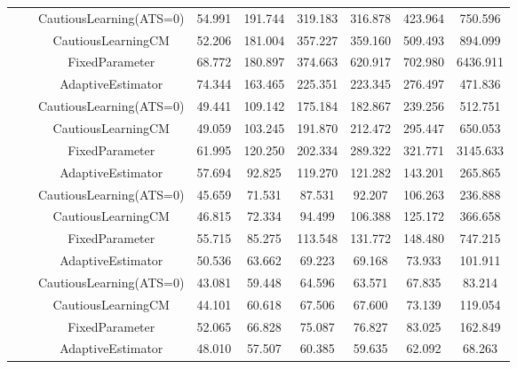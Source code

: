 \begin{table}[!h]
\begin{tabular}[t]{ccccccccc}
 &  & CautiousLearning(ATS=0) & 54.991 & 191.744 & 319.183 & 316.878 & 423.964 & 750.596\\

 &  & CautiousLearningCM & 52.206 & 181.004 & 357.227 & 359.160 & 509.493 & 894.099\\

 & \multirow[t]{-4}{*}{\centering\arraybackslash 0.25} & FixedParameter & 68.772 & 180.897 & 374.663 & 620.917 & 702.980 & 6436.911\\
\cmidrule{2-9}
 &  & AdaptiveEstimator & 74.344 & 163.465 & 225.351 & 223.345 & 276.497 & 471.836\\

 &  & CautiousLearning(ATS=0) & 49.441 & 109.142 & 175.184 & 182.867 & 239.256 & 512.751\\

 &  & CautiousLearningCM & 49.059 & 103.245 & 191.870 & 212.472 & 295.447 & 650.053\\

 & \multirow[t]{-4}{*}{\centering\arraybackslash 0.35} & FixedParameter & 61.995 & 120.250 & 202.334 & 289.322 & 321.771 & 3145.633\\
\cmidrule{2-9}
 &  & AdaptiveEstimator & 57.694 & 92.825 & 119.270 & 121.282 & 143.201 & 265.865\\

 &  & CautiousLearning(ATS=0) & 45.659 & 71.531 & 87.531 & 92.207 & 106.263 & 236.888\\

 &  & CautiousLearningCM & 46.815 & 72.334 & 94.499 & 106.388 & 125.172 & 366.658\\

 & \multirow[t]{-4}{*}{\centering\arraybackslash 0.50} & FixedParameter & 55.715 & 85.275 & 113.548 & 131.772 & 148.480 & 747.215\\
\cmidrule{2-9}
 &  & AdaptiveEstimator & 50.536 & 63.662 & 69.223 & 69.168 & 73.933 & 101.911\\

 &  & CautiousLearning(ATS=0) & 43.081 & 59.448 & 64.596 & 63.571 & 67.835 & 83.214\\

 &  & CautiousLearningCM & 44.101 & 60.618 & 67.506 & 67.600 & 73.139 & 119.054\\

 & \multirow[t]{-4}{*}{\centering\arraybackslash 0.75} & FixedParameter & 52.065 & 66.828 & 75.087 & 76.827 & 83.025 & 162.849\\
\cmidrule{2-9}
 &  & AdaptiveEstimator & 48.010 & 57.507 & 60.385 & 59.635 & 62.092 & 68.263\\


\end{tabular}
\end{table}
